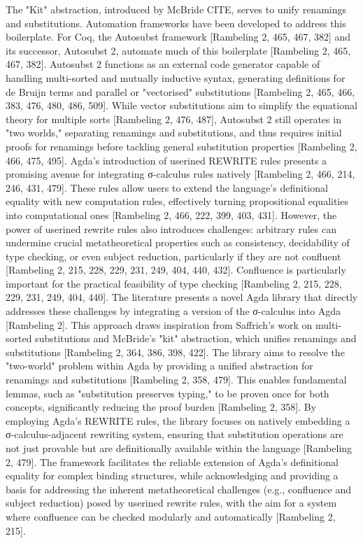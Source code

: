\documentclass[screen,nonacm]{acmart}
\begin{document}
The "Kit" abstraction, introduced by McBride CITE, serves to unify renamings
and substitutions. Automation frameworks have been developed to address this
boilerplate. For Coq, the Autosubst framework [Rambeling 2, 465, 467, 382] and
its successor, Autosubst 2, automate much of this boilerplate [Rambeling 2,
            465, 467, 382]. Autosubst 2 functions as an external code generator capable of
handling multi-sorted and mutually inductive syntax, generating definitions for
de Bruijn terms and parallel or "vectorised" substitutions [Rambeling 2, 465,
            466, 383, 476, 480, 486, 509]. While vector substitutions aim to simplify the
equational theory for multiple sorts [Rambeling 2, 476, 487], Autosubst 2 still
operates in "two worlds," separating renamings and substitutions, and thus
requires initial proofs for renamings before tackling general substitution
properties [Rambeling 2, 466, 475, 495]. Agda's introduction of userined
REWRITE rules presents a promising avenue for integrating σ-calculus rules
natively [Rambeling 2, 466, 214, 246, 431, 479]. These rules allow users to
extend the language's definitional equality with new computation rules,
effectively turning propositional equalities into computational ones [Rambeling
            2, 466, 222, 399, 403, 431]. However, the power of userined rewrite rules also
introduces challenges: arbitrary rules can undermine crucial metatheoretical
properties such as consistency, decidability of type checking, or even subject
reduction, particularly if they are not confluent [Rambeling 2, 215, 228, 229,
            231, 249, 404, 440, 432]. Confluence is particularly important for the
practical feasibility of type checking [Rambeling 2, 215, 228, 229, 231, 249,
            404, 440]. The literature presents a novel Agda library that directly addresses
these challenges by integrating a version of the σ-calculus into Agda
      [Rambeling 2]. This approach draws inspiration from Saffrich's work on
multi-sorted substitutions and McBride's "kit" abstraction, which unifies
renamings and substitutions [Rambeling 2, 364, 386, 398, 422]. The library aims
to resolve the "two-world" problem within Agda by providing a unified
abstraction for renamings and substitutions [Rambeling 2, 358, 479]. This
enables fundamental lemmas, such as "substitution preserves typing," to be
proven once for both concepts, significantly reducing the proof burden
      [Rambeling 2, 358]. By employing Agda's REWRITE rules, the library focuses on
natively embedding a σ-calculus-adjacent rewriting system, ensuring that
substitution operations are not just provable but are definitionally available
within the language [Rambeling 2, 479]. The framework facilitates the reliable
extension of Agda's definitional equality for complex binding structures, while
acknowledging and providing a basis for addressing the inherent metatheoretical
challenges (e.g., confluence and subject reduction) posed by userined rewrite
rules, with the aim for a system where confluence can be checked modularly and
automatically [Rambeling 2, 215].
\end{document}
